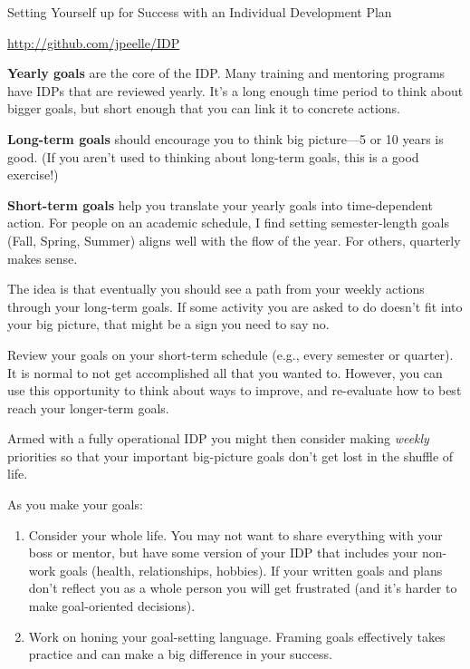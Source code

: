 \documentclass[letterpaper,oneside,11pt,article, portrait]{memoir}
\begin{document}
\pagestyle{empty}


\begin{centering}

{\Large Setting Yourself up for Success with an Individual Development Plan}

\small{\url{http://github.com/jpeelle/IDP}}

\end{centering}

\vspace{.2in}


\textbf {Yearly goals} are the core of the IDP. Many training and mentoring programs have IDPs that are reviewed yearly. It's a long enough time period to think about bigger goals, but short enough that you can link it to concrete actions.

\textbf{Long-term goals} should encourage you to think big picture---5 or 10 years is good. (If you aren't used to thinking about long-term goals, this is a good exercise!)

\textbf{Short-term goals} help you translate your yearly goals into time-dependent action. For people on an academic schedule, I find setting semester-length goals (Fall, Spring, Summer) aligns well with the flow of the year. For others, quarterly makes sense.

The idea is that eventually you should see a path from your weekly actions through your long-term goals. If some activity you are asked to do doesn't fit into your big picture, that might be a sign you need to say no.

Review your goals on your short-term schedule (e.g., every semester or quarter). It is normal to not get accomplished all that you wanted to. However, you can use this opportunity to think about ways to improve, and re-evaluate how to best reach your longer-term goals.

Armed with a fully operational IDP you might then consider making \textit{weekly} priorities so that your important big-picture goals don't get lost in the shuffle of life.

As you make your goals:

\begin{enumerate}
\item Consider your whole life. You may not want to share everything with your boss or mentor, but have some version of your IDP that includes your non-work goals (health, relationships, hobbies). If your written goals and plans don't reflect you as a whole person you will get frustrated (and it's harder to make goal-oriented decisions).

\item Work on honing your goal-setting language. Framing goals effectively takes practice and can make a big difference in your success.

\end{enumerate}
\end{document}
